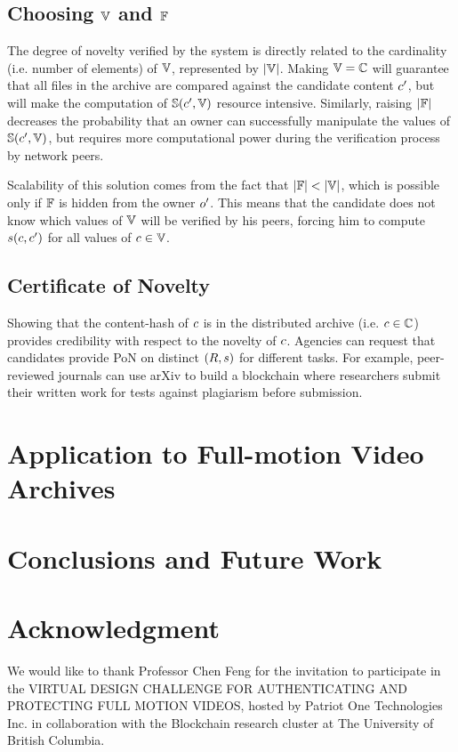 \documentclass[conference]{IEEEtran}
\begin{document}
\subsection{Choosing ${\mathbb{V}}$ and ${\mathbb{F}}$}
The degree of novelty verified by the system is directly related to the cardinality (i.e. number of elements) of ${\mathbb{V}}$, represented by $\vert{\mathbb{V}}\vert$. Making ${\mathbb{V}} = {{\mathbb{C}}}$ will guarantee that all files in the archive are compared against the candidate content ${c}^\prime$, but will make the computation of ${\mathbb{S}}({c}^\prime, {\mathbb{V}})$ resource intensive. Similarly, raising $\vert{\mathbb{F}}\vert$ decreases the probability that an owner can successfully manipulate the values of ${\mathbb{S}}({c}^\prime, {\mathbb{V}})$, but requires more computational power during the verification process by network peers.

Scalability of this solution comes from the fact that $\vert{\mathbb{F}}\vert < \vert{\mathbb{V}}\vert$, which is possible only if ${\mathbb{F}}$ is hidden from the owner ${o}^\prime$. This means that the candidate does not know which values of ${\mathbb{V}}$ will be verified by his peers, forcing him to compute ${s}({c},{c}^\prime)$ for all values of ${c} \in {\mathbb{V}}$.
\subsection{Certificate of Novelty}
Showing that the content-hash of ${c}$ is in the distributed archive (i.e. ${c} \in {{\mathbb{C}}}$) provides credibility with respect to the novelty of ${c}$. Agencies can request that candidates provide PoN on distinct $(R, {s})$ for different tasks. For example, peer-reviewed journals can use arXiv to build a blockchain where researchers submit their written work for tests against plagiarism before submission.
\section{Application to Full-motion Video Archives}
\section{Conclusions and Future Work}
\section*{Acknowledgment}
We would like to thank Professor Chen Feng for the invitation to participate in the VIRTUAL DESIGN CHALLENGE FOR AUTHENTICATING  AND  PROTECTING  FULL  MOTION  VIDEOS, hosted by Patriot One Technologies Inc. in collaboration with the Blockchain research cluster at The University of British Columbia.
{}

\end{document}
